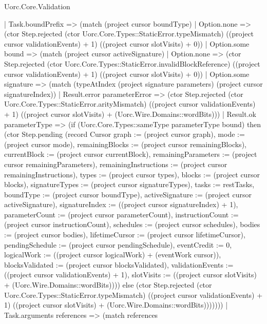 \begin{lexlean}{Uorc.Core.Validation}
\begin{semanticmodule}
{      | Task.boundPrefix => (match (project cursor boundType)
        | Option.none => (ctor Step.rejected (ctor Uorc.Core.Types::StaticError.typeMismatch) ((project cursor validationEvents) + 1) ((project cursor slotVisits) + 0))
        | Option.some bound => (match (project cursor activeSignature)
          | Option.none => (ctor Step.rejected (ctor Uorc.Core.Types::StaticError.invalidBlockReference) ((project cursor validationEvents) + 1) ((project cursor slotVisits) + 0))
          | Option.some signature => (match (typeAtIndex (project signature parameters) (project cursor signatureIndex))
            | Result.error parameterError => (ctor Step.rejected (ctor Uorc.Core.Types::StaticError.arityMismatch) ((project cursor validationEvents) + 1) ((project cursor slotVisits) + (Uorc.Wire.Domains::wordBits)))
            | Result.ok parameterType => (if (Uorc.Core.Types::sameType parameterType bound) then (ctor Step.pending (record Cursor {graph := (project cursor graph), mode := (project cursor mode), remainingBlocks := (project cursor remainingBlocks), currentBlock := (project cursor currentBlock), remainingParameters := (project cursor remainingParameters), remainingInstructions := (project cursor remainingInstructions), types := (project cursor types), blocks := (project cursor blocks), signatureTypes := (project cursor signatureTypes), tasks := restTasks, boundType := (project cursor boundType), activeSignature := (project cursor activeSignature), signatureIndex := ((project cursor signatureIndex) + 1), parameterCount := (project cursor parameterCount), instructionCount := (project cursor instructionCount), schedules := (project cursor schedules), bodies := (project cursor bodies), lifetimeCursor := (project cursor lifetimeCursor), pendingSchedule := (project cursor pendingSchedule), eventCredit := 0, logicalWork := ((project cursor logicalWork) + (eventWork cursor)), blocksValidated := (project cursor blocksValidated), validationEvents := ((project cursor validationEvents) + 1), slotVisits := ((project cursor slotVisits) + (Uorc.Wire.Domains::wordBits))})) else (ctor Step.rejected (ctor Uorc.Core.Types::StaticError.typeMismatch) ((project cursor validationEvents) + 1) ((project cursor slotVisits) + (Uorc.Wire.Domains::wordBits)))))))
      | Task.arguments references => (match references
}
\end{semanticmodule}
\end{lexlean}
